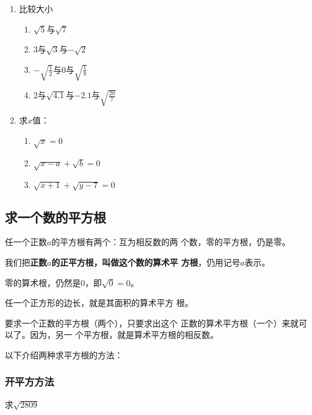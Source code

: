 \begin{ex}
\begin{enumerate}
    \item 比较大小
    \begin{multicols}{2}
\begin{enumerate}
    \item $\sqrt{5}$与$\sqrt{7}$
    \item 3与$\sqrt{3}$与$-\sqrt{2}$
    \item $-\sqrt{\frac{1}{2}}$与0与$\sqrt{\frac{1}{9}}$
    \item 2与$\sqrt{4.1}$与$-2.1$与$\sqrt{\frac{20}{7}}$
\end{enumerate}
    \end{multicols}

    \item 求$x$值：
\begin{enumerate}
    \item $\sqrt{x}=0$
    \item $\sqrt{x-a}+\sqrt{b}=0$
    \item $\sqrt{x+1}+\sqrt{y-7}=0$
\end{enumerate}
\end{enumerate}
    
\end{ex}

\subsection{求一个数的平方根}
任一个正数$a$的平方根有两个：互为相反数的两
个数，零的平方根，仍是零。

我们把\textbf{正数$a$的正平方根，叫做这个数的算术平
方根}，仍用记号$a$表示。

零的算术根，仍然是0，即$\sqrt{0}=0$。

任一个正方形的边长，就是其面积的算术平方
根。

要求一个正数的平方根（两个），只要求出这个
正数的算术平方根（一个）来就可以了。因为，另一
个平方根，就是算术平方根的相反数。

以下介绍两种求平方根的方法：

\subsubsection{开平方方法}
\begin{example}
    求$\sqrt{2809}$
\end{example}

